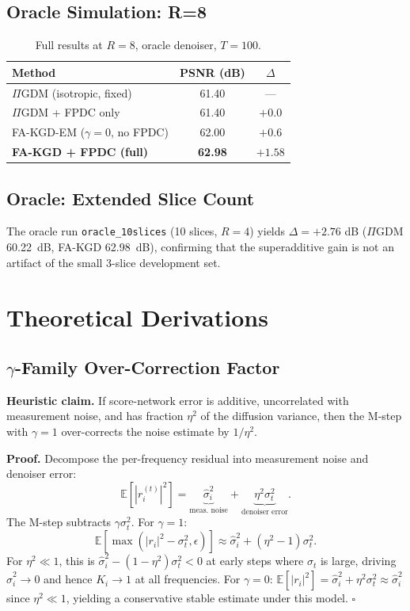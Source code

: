\documentclass[10pt,twocolumn,letterpaper]{article}
\newcommand{\hatsig}{\hat{\sigma}}
\newcommand{\PIGDM}{$\Pi$GDM}
\begin{document}
\subsection{Oracle Simulation: R=8}

\begin{table}[h]
\centering
\caption{Full results at $R=8$, oracle denoiser, $T=100$.}
\label{tab:r8}
\begin{tabular}{lcc}
\toprule
\textbf{Method} & \textbf{PSNR (dB)} & \textbf{$\Delta$} \\
\midrule
\PIGDM{} (isotropic, fixed) & 61.40 & — \\
\PIGDM{} + FPDC only & 61.40 & $+$0.0 \\
FA-KGD-EM ($\gamma{=}0$, no FPDC) & 62.00 & $+$0.6 \\
\textbf{FA-KGD + FPDC (full)} & \textbf{62.98} & $\mathbf{+1.58}$ \\
\bottomrule
\end{tabular}
\end{table}

\subsection{Oracle: Extended Slice Count}

The oracle run \texttt{oracle\_10slices} (10 slices, $R=4$) yields
$\Delta = +2.76$ dB (\PIGDM{} 60.22~dB, FA-KGD 62.98~dB), confirming that
the superadditive gain is not an artifact of the small 3-slice development
set.

\section{Theoretical Derivations}
\label{app:theory}

\subsection{\texorpdfstring{$\gamma$-Family Over-Correction Factor}{gamma-Family Over-Correction Factor}}

\textbf{Heuristic claim.} If score-network error is additive, uncorrelated with
measurement noise, and has fraction $\eta^2$ of the diffusion variance, then
the M-step with $\gamma = 1$ over-corrects the noise estimate by $1/\eta^2$.

\textbf{Proof.} Decompose the per-frequency residual into measurement noise
and denoiser error:
\[
  \mathbb{E}[|r_i^{(t)}|^2] = \underbrace{\hatsig_i^2}_{\text{meas. noise}}
  + \underbrace{\eta^2 \sigma_t^2}_{\text{denoiser error}}.
\]
The M-step subtracts $\gamma\sigma_t^2$. For $\gamma = 1$:
\[
  \mathbb{E}[\max(|r_i|^2 - \sigma_t^2, \epsilon)]
  \approx \hatsig_i^2 + (\eta^2 - 1)\sigma_t^2.
\]
For $\eta^2 \ll 1$, this is $\hatsig_i^2 - (1-\eta^2)\sigma_t^2 < 0$ at
early steps where $\sigma_t$ is large, driving $\hatsig_i^2 \rightarrow 0$
and hence $K_i \rightarrow 1$ at all frequencies. For $\gamma = 0$:
$\mathbb{E}[|r_i|^2] = \hatsig_i^2 + \eta^2\sigma_t^2 \approx \hatsig_i^2$
since $\eta^2 \ll 1$, yielding a conservative stable estimate under this
model. \hfill $\square$
\end{document}
